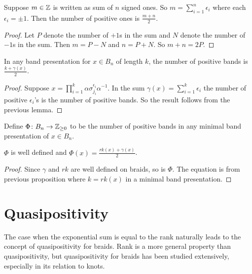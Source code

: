 \documentclass[12pt]{thesis}
\begin{document}
\begin{lemma}
    Suppose $m \in \mathbb{Z}$ is written
    as sum of $n$ signed ones.
    So $m = \sum_{i=1}^{n} \epsilon_{i}$ where each $\epsilon_{i} = \pm 1$.
    Then the number of positive ones is $\frac{m + n}{2}$.
\end{lemma}

\begin{proof}
    Let $P$ denote the number of $+1$s in the sum
    and $N$ denote the number of $-1$s in the sum.
    Then $m = P - N$ and $n = P + N$.
    So $m + n = 2P$.
\end{proof}

\begin{proposition}
    \label{prop:positive-negative-bands}
    In any band presentation for $x \in B_{n}$ of length $k$,
    the number of positive bands
    is $\frac{k + \gamma(x)}{2}$.
\end{proposition}

\begin{proof}
    Suppose $x = \prod_{i = 1}^{k} \alpha\sigma_{j_{i}}^{\epsilon_{i}}\alpha^{-1}$.
    In the sum $\gamma(x) = \sum_{i=1}^{k} \epsilon_{i}$
    the number of positive $\epsilon_{i}$'s is the number of positive bands.
    So the result follows from the previous lemma.
\end{proof}

Define $\Phi \colon B_{n} \rightarrow \mathbb{Z}_{\geq 0}$ 
to be the number of positive bands
in any minimal band presentation of $x \in B_{n}$.
\begin{corollary}
   $\Phi$ is well defined and $\Phi(x) = \frac{rk(x) + \gamma(x)}{2}$.
\end{corollary}

\begin{proof}
    Since $\gamma$ and $rk$ are well defined on braids, so is $\Phi$.
    The equation is from previous proposition
    where $k = rk(x)$ in a minimal band presentation.
\end{proof}

\section{Quasipositivity}

The case when the exponential sum is equal to the rank 
naturally leads to the concept of quasipositivity for braids.
Rank is a more general property than quasipositivity, but quasipositivity
for braids has been studied extensively, especially in its relation to knots.
\end{document}
